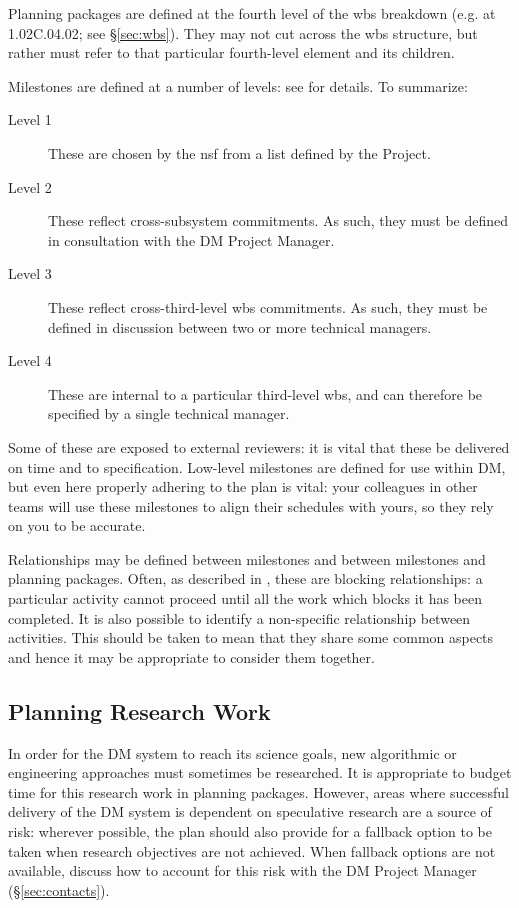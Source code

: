 Planning packages are defined at the fourth level of the \gls{wbs} breakdown (e.g. at 1.02C.04.02; see \S\ref{sec:wbs}).
They may not cut across the \gls{wbs} structure, but rather must refer to that particular fourth-level \gls{element} and its children.

Milestones are defined at a number of levels: see  for details.
To summarize:

\begin{description}
\item[Level 1]
These are chosen by the \gls{nsf} from a list defined by the Project.
\item[Level 2]
These reflect cross-subsystem commitments. As such, they must be defined
in consultation with the DM Project Manager.
\item[Level 3]
These reflect cross-third-level \gls{wbs} commitments. As such, they must be
defined in discussion between two or more technical managers.
\item[Level 4]
These are internal to a particular third-level \gls{wbs}, and can therefore be
specified by a single technical manager.
\end{description}

Some of these are exposed to external reviewers: it is vital that these
be delivered on time and to specification. Low-level milestones are
defined for use within DM, but even here properly adhering to the plan
is vital: your colleagues in other teams will use these milestones to
align their schedules with yours, so they rely on you to be accurate.

Relationships may be defined between milestones and between milestones
and planning packages. Often, as described in , these are blocking
relationships: a particular activity cannot proceed until all the work
which blocks it has been completed. It is also possible to identify a
non-specific relationship between activities. This should be taken to
mean that they share some common aspects and hence it may be appropriate
to consider them together.

\subsection{Planning Research Work}
\label{sec:long-term-research}

In order for the DM system to reach its science goals, new algorithmic or engineering approaches must sometimes be researched.
It is appropriate to budget time for this research work in planning packages.
However, areas where successful delivery of the DM system is dependent on speculative research are a source of \gls{risk}: wherever possible, the plan should also provide for a fallback option to be taken when research objectives are not achieved.
When fallback options are not available, discuss how to account for this \gls{risk} with the DM Project Manager (\S\ref{sec:contacts}).

